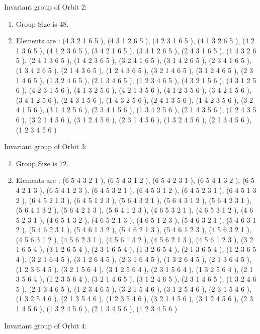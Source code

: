 \documentclass[12pt]{article}
\begin{document}
Invariant group of Orbit $2$:
\begin{enumerate}
\item Group Size is $48$.
\item Elements are : (4 3 2 1 6 5  ), (4 3 1 2 6 5  ), (4 2 3 1 6 5  ), (4 1 3 2 6 5  ), (4 2 1 3 6 5  ), (4 1 2 3 6 5  ), (3 4 2 1 6 5  ), (3 4 1 2 6 5  ), (2 4 3 1 6 5  ), (1 4 3 2 6 5  ), (2 4 1 3 6 5  ), (1 4 2 3 6 5  ), (3 2 4 1 6 5  ), (3 1 4 2 6 5  ), (2 3 4 1 6 5  ), (1 3 4 2 6 5  ), (2 1 4 3 6 5  ), (1 2 4 3 6 5  ), (3 2 1 4 6 5  ), (3 1 2 4 6 5  ), (2 3 1 4 6 5  ), (1 3 2 4 6 5  ), (2 1 3 4 6 5  ), (1 2 3 4 6 5  ), (4 3 2 1 5 6  ), (4 3 1 2 5 6  ), (4 2 3 1 5 6  ), (4 1 3 2 5 6  ), (4 2 1 3 5 6  ), (4 1 2 3 5 6  ), (3 4 2 1 5 6  ), (3 4 1 2 5 6  ), (2 4 3 1 5 6  ), (1 4 3 2 5 6  ), (2 4 1 3 5 6  ), (1 4 2 3 5 6  ), (3 2 4 1 5 6  ), (3 1 4 2 5 6  ), (2 3 4 1 5 6  ), (1 3 4 2 5 6  ), (2 1 4 3 5 6  ), (1 2 4 3 5 6  ), (3 2 1 4 5 6  ), (3 1 2 4 5 6  ), (2 3 1 4 5 6  ), (1 3 2 4 5 6  ), (2 1 3 4 5 6  ), (1 2 3 4 5 6  )
\end{enumerate}
Invariant group of Orbit $3$:
\begin{enumerate}
\item Group Size is $72$.
\item Elements are : (6 5 4 3 2 1  ), (6 5 4 3 1 2  ), (6 5 4 2 3 1  ), (6 5 4 1 3 2  ), (6 5 4 2 1 3  ), (6 5 4 1 2 3  ), (6 4 5 3 2 1  ), (6 4 5 3 1 2  ), (6 4 5 2 3 1  ), (6 4 5 1 3 2  ), (6 4 5 2 1 3  ), (6 4 5 1 2 3  ), (5 6 4 3 2 1  ), (5 6 4 3 1 2  ), (5 6 4 2 3 1  ), (5 6 4 1 3 2  ), (5 6 4 2 1 3  ), (5 6 4 1 2 3  ), (4 6 5 3 2 1  ), (4 6 5 3 1 2  ), (4 6 5 2 3 1  ), (4 6 5 1 3 2  ), (4 6 5 2 1 3  ), (4 6 5 1 2 3  ), (5 4 6 3 2 1  ), (5 4 6 3 1 2  ), (5 4 6 2 3 1  ), (5 4 6 1 3 2  ), (5 4 6 2 1 3  ), (5 4 6 1 2 3  ), (4 5 6 3 2 1  ), (4 5 6 3 1 2  ), (4 5 6 2 3 1  ), (4 5 6 1 3 2  ), (4 5 6 2 1 3  ), (4 5 6 1 2 3  ), (3 2 1 6 5 4  ), (3 1 2 6 5 4  ), (2 3 1 6 5 4  ), (1 3 2 6 5 4  ), (2 1 3 6 5 4  ), (1 2 3 6 5 4  ), (3 2 1 6 4 5  ), (3 1 2 6 4 5  ), (2 3 1 6 4 5  ), (1 3 2 6 4 5  ), (2 1 3 6 4 5  ), (1 2 3 6 4 5  ), (3 2 1 5 6 4  ), (3 1 2 5 6 4  ), (2 3 1 5 6 4  ), (1 3 2 5 6 4  ), (2 1 3 5 6 4  ), (1 2 3 5 6 4  ), (3 2 1 4 6 5  ), (3 1 2 4 6 5  ), (2 3 1 4 6 5  ), (1 3 2 4 6 5  ), (2 1 3 4 6 5  ), (1 2 3 4 6 5  ), (3 2 1 5 4 6  ), (3 1 2 5 4 6  ), (2 3 1 5 4 6  ), (1 3 2 5 4 6  ), (2 1 3 5 4 6  ), (1 2 3 5 4 6  ), (3 2 1 4 5 6  ), (3 1 2 4 5 6  ), (2 3 1 4 5 6  ), (1 3 2 4 5 6  ), (2 1 3 4 5 6  ), (1 2 3 4 5 6  )
\end{enumerate}
Invariant group of Orbit $4$:
\end{document}
